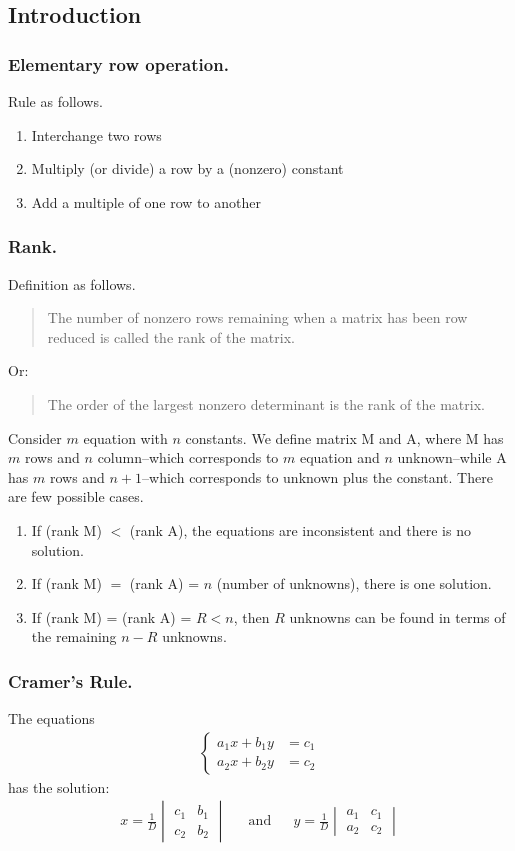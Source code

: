 \documentclass[../main.tex]{subfiles}
\begin{document}
\subsection{Introduction}
\subsubsection{Elementary row operation.} 
Rule as follows.
\begin{enumerate}
	\item Interchange two rows
	\item Multiply (or divide) a row by a (nonzero) constant
	\item Add a multiple of one row to another
\end{enumerate}

\subsubsection{Rank.} 
Definition as follows.
\begin{quote}
	The number of nonzero rows remaining when a matrix has been row reduced is called the rank of the matrix.
\end{quote}
Or:
\begin{quote}
	The order of the largest nonzero determinant is the rank of the matrix.
\end{quote}

Consider $m$ equation with $n$ constants. We define matrix M and A, where M has $m$ rows and $n$ column--which corresponds to $m$ equation and $n$ unknown--while A has $m$ rows and $n+1$--which corresponds to unknown plus the constant. There are few possible cases.
\begin{enumerate}
	\item If (rank M) $<$ (rank A), the equations are inconsistent and there is no solution.
	\item If (rank M) $=$ (rank A) = $n$ (number of unknowns), there is one solution.
	\item If (rank M) = (rank A) = $R < n$, then $R$ unknowns can be found in terms of the remaining $n-R$ unknowns.
\end{enumerate}

\subsubsection{Cramer's Rule.} The equations
\begin{align*}
	\begin{cases}
		a_1x+b_1y & =c_1 \\
		a_2x+b_2y & =c_2
	\end{cases}
\end{align*}
has the solution:
\begin{align*}
	x=\frac{1}{D}
	\begin{vmatrix}
		c_1 & b_1 \\
		c_2 & b_2
	\end{vmatrix} &  & \mathrm{and} &  &
	y=\frac{1}{D}
	\begin{vmatrix}
		a_1 & c_1 \\
		a_2 & c_2
	\end{vmatrix}
\end{align*}
\end{document}
